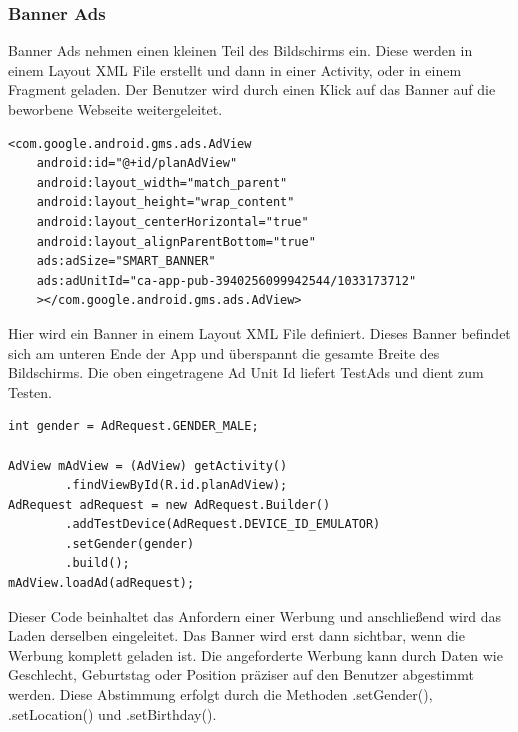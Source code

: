 \documentclass[FIPLY_base.tex]{subfiles}
\begin{document}
\newpage
\subsubsection{Banner Ads}
Banner Ads nehmen einen kleinen Teil des Bildschirms ein. Diese werden in einem Layout XML File erstellt und dann in einer Activity, oder in einem Fragment geladen. 
Der Benutzer wird durch einen Klick auf das Banner auf die beworbene Webseite weitergeleitet. 
\ \\
\begin{lstlisting}[caption={AdView in einem Layout XML File},label=DescriptiveLabel]
<com.google.android.gms.ads.AdView
    android:id="@+id/planAdView"
    android:layout_width="match_parent"
    android:layout_height="wrap_content"
    android:layout_centerHorizontal="true"
    android:layout_alignParentBottom="true"
    ads:adSize="SMART_BANNER"
    ads:adUnitId="ca-app-pub-3940256099942544/1033173712"
    ></com.google.android.gms.ads.AdView>
\end{lstlisting}
Hier wird ein Banner in einem Layout XML File definiert. Dieses Banner befindet sich am unteren Ende der App und überspannt die gesamte Breite des Bildschirms.
Die oben eingetragene Ad Unit Id liefert TestAds und dient zum Testen.
\ \\
\begin{lstlisting}[caption={Anfordern einer Banner Ad},label=DescriptiveLabel]
int gender = AdRequest.GENDER_MALE;

AdView mAdView = (AdView) getActivity()
        .findViewById(R.id.planAdView);
AdRequest adRequest = new AdRequest.Builder()
        .addTestDevice(AdRequest.DEVICE_ID_EMULATOR)
        .setGender(gender)
        .build();
mAdView.loadAd(adRequest);
\end{lstlisting}
Dieser Code beinhaltet das Anfordern einer Werbung und anschließend wird das Laden derselben eingeleitet.
Das Banner wird erst dann sichtbar, wenn die Werbung komplett geladen ist. 
Die angeforderte Werbung kann durch Daten wie Geschlecht, Geburtstag oder Position präziser auf den Benutzer abgestimmt werden.
Diese Abstimmung erfolgt durch die Methoden .setGender(), .setLocation() und .setBirthday().	

\newpage
\end{document}

